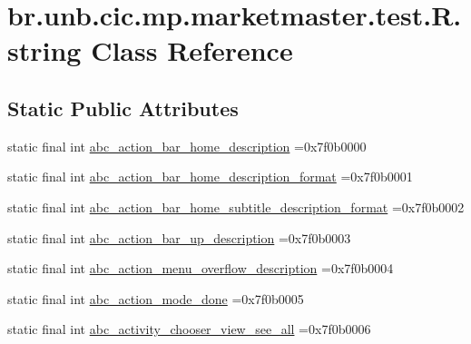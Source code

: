 \hypertarget{classbr_1_1unb_1_1cic_1_1mp_1_1marketmaster_1_1test_1_1R_1_1string}{}\section{br.\+unb.\+cic.\+mp.\+marketmaster.\+test.\+R.\+string Class Reference}
\label{classbr_1_1unb_1_1cic_1_1mp_1_1marketmaster_1_1test_1_1R_1_1string}
\subsection*{Static Public Attributes}
\begin{DoxyCompactItemize}
\item 
static final int \mbox{\hyperlink{classbr_1_1unb_1_1cic_1_1mp_1_1marketmaster_1_1test_1_1R_1_1string_a277367d2501698feaef62a2826f5d196}{abc\+\_\+action\+\_\+bar\+\_\+home\+\_\+description}} =0x7f0b0000
\item 
static final int \mbox{\hyperlink{classbr_1_1unb_1_1cic_1_1mp_1_1marketmaster_1_1test_1_1R_1_1string_a06babb7b40c81bfd4427edded62ee727}{abc\+\_\+action\+\_\+bar\+\_\+home\+\_\+description\+\_\+format}} =0x7f0b0001
\item 
static final int \mbox{\hyperlink{classbr_1_1unb_1_1cic_1_1mp_1_1marketmaster_1_1test_1_1R_1_1string_a4442a097c862a8f1e2ae0e6d9bdc45cb}{abc\+\_\+action\+\_\+bar\+\_\+home\+\_\+subtitle\+\_\+description\+\_\+format}} =0x7f0b0002
\item 
static final int \mbox{\hyperlink{classbr_1_1unb_1_1cic_1_1mp_1_1marketmaster_1_1test_1_1R_1_1string_ac8280161fc0682081ea8c81f50ec0299}{abc\+\_\+action\+\_\+bar\+\_\+up\+\_\+description}} =0x7f0b0003
\item 
static final int \mbox{\hyperlink{classbr_1_1unb_1_1cic_1_1mp_1_1marketmaster_1_1test_1_1R_1_1string_a9083f4baa1031657947c10a6a08e88ba}{abc\+\_\+action\+\_\+menu\+\_\+overflow\+\_\+description}} =0x7f0b0004
\item 
static final int \mbox{\hyperlink{classbr_1_1unb_1_1cic_1_1mp_1_1marketmaster_1_1test_1_1R_1_1string_ae17bbb719468ca7148327a73a23ea5dc}{abc\+\_\+action\+\_\+mode\+\_\+done}} =0x7f0b0005
\item 
static final int \mbox{\hyperlink{classbr_1_1unb_1_1cic_1_1mp_1_1marketmaster_1_1test_1_1R_1_1string_a2e70f1bf917f93ab11b1eb6e056b5702}{abc\+\_\+activity\+\_\+chooser\+\_\+view\+\_\+see\+\_\+all}} =0x7f0b0006
\item 

\end{DoxyCompactItemize}
